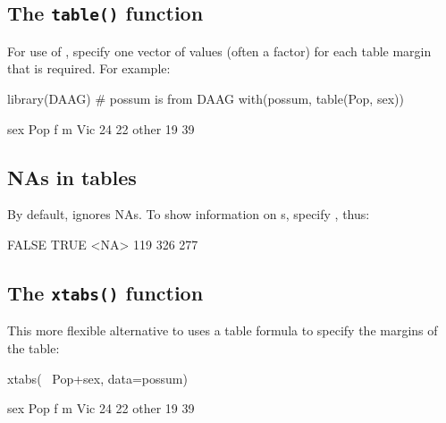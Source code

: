\subsection*{The \texttt{table()} function}\label{ss:table}
For use of , specify one vector of values (often a
factor) for each table margin that is required.  For example:
\begin{Schunk}
\begin{Sinput}
library(DAAG)        # possum is from DAAG
with(possum, table(Pop, sex))
\end{Sinput}
\begin{Soutput}
       sex
Pop      f  m
  Vic   24 22
  other 19 39
\end{Soutput}
\end{Schunk}

\subsection*{NAs in tables}

By default,  ignores NAs. To show information on
s, specify , thus:
\begin{Schunk}
\begin{Soutput}

FALSE  TRUE  <NA> 
  119   326   277 
\end{Soutput}
\end{Schunk}


\subsection*{The \texttt{xtabs()} function}
This more flexible alternative to  uses a table
formula to specify the margins of the table:
\begin{Schunk}
\begin{Sinput}
xtabs(~ Pop+sex, data=possum)
\end{Sinput}
\begin{Soutput}
       sex
Pop      f  m
  Vic   24 22
  other 19 39
\end{Soutput}
\end{Schunk}

